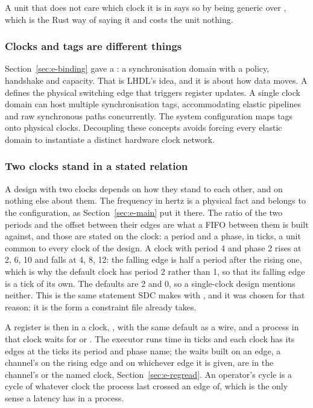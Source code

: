 A unit that does not care which clock it is in says so by being generic
over , which is the Rust way of saying it and costs the
unit nothing.

\subsubsection{Clocks and tags are different things}

Section~\ref{sec:e-binding} gave a : a synchronisation domain
with a policy, handshake and capacity. That is LHDL's idea, and it is
about how data moves. A  defines the physical switching edge
that triggers register updates. A single clock domain can host multiple
synchronisation tags, accommodating elastic pipelines and raw synchronous
paths concurrently. The system configuration maps tags onto physical
clocks. Decoupling these concepts avoids forcing every elastic domain to
instantiate a distinct hardware clock network.

\subsubsection{Two clocks stand in a stated relation}
\label{sec:e-phase}

A design with two clocks depends on how they stand to each other, and
on nothing else about them. The frequency in hertz is a physical fact
and belongs to the configuration, as Section~\ref{sec:e-main} put it
there. The ratio of the two periods and the offset between their edges
are what a FIFO between them is built against, and those are stated on
the clock: a period and a phase, in ticks, a unit common to every
clock of the design. A clock with period 4 and phase 2 rises at 2, 6,
10 and falls at 4, 8, 12: the falling edge is half a period after the
rising one, which is why the default clock has period 2 rather than 1,
so that its falling edge is a tick of its own. The defaults are 2 and
0, so a single-clock design mentions neither. This is the same
statement SDC makes with , and it
was chosen for that reason: it is the form a constraint file already
takes.

A register is then in a clock, , with the same default
as a wire, and a process in that clock waits for  or
. The executor runs time in ticks and each clock has
its edges at the ticks its period and phase name; the waits built on
an edge, a channel's  on the rising edge and  on
whichever edge it is given, are in the channel's or the named clock,
Section~\ref{sec:e-regread}. An operator's cycle is a cycle of whatever
clock the process last crossed an edge of, which is the only sense a
latency has in a process.

